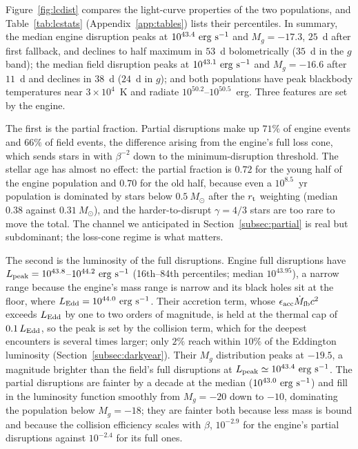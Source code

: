 \documentclass[twocolumn,pdftex]{aastex701}
\newcommand{\msun}{M_{\odot}\xspace}
\begin{document}
Figure~\ref{fig:lcdist} compares the light-curve properties of the two populations, and Table~\ref{tab:lcstats} (Appendix~\ref{app:tables}) lists their percentiles. In summary, the median engine disruption peaks at $10^{43.4}~{\rm erg~s^{-1}}$ and $M_g = -17.3$, $25$~d after first fallback, and declines to half maximum in $53$~d bolometrically ($35$~d in the $g$ band); the median field disruption peaks at $10^{43.1}~{\rm erg~s^{-1}}$ and $M_g = -16.6$ after $11$~d and declines in $38$~d ($24$~d in $g$); and both populations have peak blackbody temperatures near $3 \times 10^{4}$~K and radiate $10^{50.2}$--$10^{50.5}$~erg. Three features are set by the engine.

The first is the partial fraction. Partial disruptions make up $71\%$ of engine events and $66\%$ of field events, the difference arising from the engine's full loss cone, which sends stars in with $\beta^{-2}$ down to the minimum-disruption threshold. The stellar age has almost no effect: the partial fraction is $0.72$ for the young half of the engine population and $0.70$ for the old half, because even a $10^{8.5}$~yr population is dominated by stars below $0.5~\msun$ after the $r_{\rm t}$ weighting (median $0.38$ against $0.31~\msun$), and the harder-to-disrupt $\gamma = 4/3$ stars are too rare to move the total. The channel we anticipated in Section~\ref{subsec:partial} is real but subdominant; the loss-cone regime is what matters.

The second is the luminosity of the full disruptions. Engine full disruptions have $L_{\rm peak} = 10^{43.8}$--$10^{44.2}~{\rm erg~s^{-1}}$ (16th--84th percentiles; median $10^{43.95}$), a narrow range because the engine's mass range is narrow and its black holes sit at the floor, where $L_{\rm Edd} = 10^{44.0}~{\rm erg~s^{-1}}$. Their accretion term, whose $\epsilon_{\rm acc} \dot{M}_{\rm fb} c^{2}$ exceeds $L_{\rm Edd}$ by one to two orders of magnitude, is held at the thermal cap of $0.1\, L_{\rm Edd}$, so the peak is set by the collision term, which for the deepest encounters is several times larger; only $2\%$ reach within $10\%$ of the Eddington luminosity (Section~\ref{subsec:darkyear}). Their $M_g$ distribution peaks at $-19.5$, a magnitude brighter than the field's full disruptions at $L_{\rm peak} \simeq 10^{43.4}~{\rm erg~s^{-1}}$. The partial disruptions are fainter by a decade at the median ($10^{43.0}~{\rm erg~s^{-1}}$) and fill in the luminosity function smoothly from $M_g = -20$ down to $-10$, dominating the population below $M_g = -18$; they are fainter both because less mass is bound and because the collision efficiency scales with $\beta$, $10^{-2.9}$ for the engine's partial disruptions against $10^{-2.4}$ for its full ones.
\end{document}
